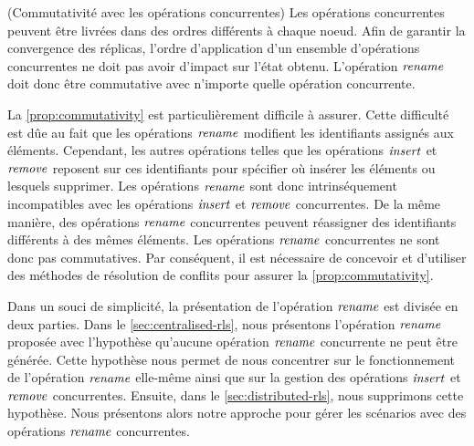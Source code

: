 \begin{property}(Commutativité avec les opérations concurrentes)
  \label{prop:commutativity}
  Les opérations concurrentes peuvent être livrées dans des ordres différents à chaque noeud.
  Afin de garantir la convergence des réplicas, l'ordre d'application d'un ensemble d'opérations concurrentes ne doit pas avoir d'impact sur l'état obtenu.
  L'opération $\mathit{rename}$ doit donc être commutative avec n'importe quelle opération concurrente.
\end{property}

La \autoref{prop:commutativity} est particulièrement difficile à assurer.
Cette difficulté est dûe au fait que les opérations $\mathit{rename}$ modifient les identifiants assignés aux éléments.
Cependant, les autres opérations telles que les opérations $\mathit{insert}$ et $\mathit{remove}$ reposent sur ces identifiants pour spécifier où insérer les éléments ou lesquels supprimer.
Les opérations $\mathit{rename}$ sont donc intrinséquement incompatibles avec les opérations $\mathit{insert}$ et $\mathit{remove}$ concurrentes.
De la même manière, des opérations $\mathit{rename}$ concurrentes peuvent réassigner des identifiants différents à des mêmes éléments.
Les opérations $\mathit{rename}$ concurrentes ne sont donc pas commutatives.
Par conséquent, il est nécessaire de concevoir et d'utiliser des méthodes de résolution de conflits pour assurer la \autoref{prop:commutativity}.

Dans un souci de simplicité, la présentation de l'opération $\mathit{rename}$ est divisée en deux parties.
Dans le \autoref{sec:centralised-rls}, nous présentons l'opération $\mathit{rename}$ proposée avec l'hypothèse qu'aucune opération $\mathit{rename}$ concurrente ne peut être générée.
Cette hypothèse nous permet de nous concentrer sur le fonctionnement de l'opération $\mathit{rename}$ elle-même ainsi que sur la gestion des opérations $\mathit{insert}$ et $\mathit{remove}$ concurrentes.
Ensuite, dans le \autoref{sec:distributed-rls}, nous supprimons cette hypothèse.
Nous présentons alors notre approche pour gérer les scénarios avec des opérations $\mathit{rename}$ concurrentes.
